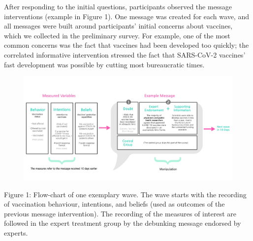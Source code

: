 \documentclass[authordate, empirical]{jote-new-article}
\begin{document}
	After responding to the initial questions, participants observed the message interventions (example in Figure 1). One message was created for each wave, and all messages were built around participants' initial concerns about vaccines, which we collected in the preliminary survey. For example, one of the most common concerns was the fact that vaccines had been developed too quickly; the correlated informative intervention stressed the fact that SARS-CoV-2 vaccines' fast development was possible by cutting most bureaucratic times.



	\begin{figure}
		\includegraphics[width=\linewidth]{media/image1.jpg}

		\caption{}

		\label{fig:rId9}


	\end{figure}



	Figure 1: Flow-chart of one exemplary wave. The wave starts with the recording of vaccination behaviour, intentions, and beliefs (used as outcomes of the previous message intervention). The recording of the measures of interest are followed in the expert treatment group by the debunking message endorsed by experts.
\end{document}
